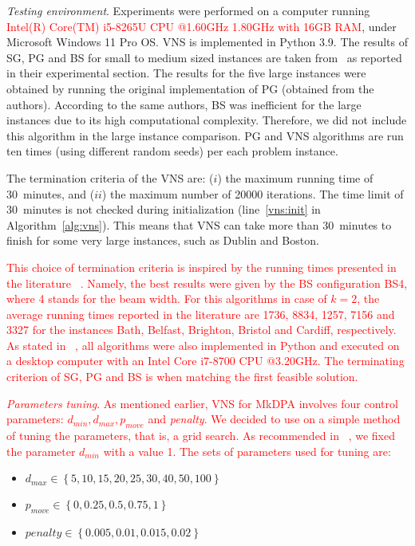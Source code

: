 \documentclass[dvipsnames,format=sigconf]{acmart} %
\begin{document}
 \emph{Testing environment}. Experiments were performed on a computer running \textcolor{red}{Intel(R) Core(TM) i5-8265U CPU @1.60GHz 1.80GHz with 16GB RAM}, under Microsoft Windows 11 Pro OS. VNS is implemented in Python 3.9. The results of SG, PG and BS for small to medium sized instances are taken from~\cite{corcoran2021heuristics} as reported in their experimental section. The results for the five large instances were obtained by running the original implementation of PG (obtained from the authors). According to the same authors, BS was inefficient for the large instances due to its high computational complexity. Therefore, we did not include this algorithm in the large instance comparison.  
 PG and VNS algorithms are run ten times (using different random seeds) per each problem instance. 
 
  The termination criteria of the VNS are: ($i$) the maximum running time of 30~minutes, and ($ii$) the maximum number of 20000 iterations. The time limit of 30~minutes is not checked during initialization (line~\ref{vns:init} in Algorithm~\ref{alg:vns}). This means that VNS can take more than 30~minutes to finish for some very large instances, such as Dublin and Boston. 
  
  \textcolor{red}{This choice of termination criteria is inspired by the running times presented in the literature ~\cite{corcoran2021heuristics}. Namely, the best results were given by the BS configuration BS4, where 4 stands for the beam width. For this algorithms in case of $k=2$, the average running times reported in the literature are 1736, 8834, 1257, 7156 and 3327 for the instances Bath, Belfast, Brighton, Bristol and Cardiff, respectively.} \textcolor{red}{As stated in ~\cite{corcoran2021heuristics}, all algorithms were also implemented in  Python and executed on a desktop computer with an Intel Core i7-8700 CPU @3.20GHz. The terminating criterion of SG, PG and BS is when matching the first feasible solution.}
   

   \textcolor{red}{\emph{Parameters tuning}. As mentioned earlier, VNS for MkDPA involves four control parameters: $d_{min}, d_{max}, p_{move}$ and \emph{penalty}. We decided to use on a simple method of tuning the parameters, that is, a grid search. As recommended in  ~\cite{mladenovic1997variable}, we fixed the parameter $d_{min}$ with a value 1. The sets of parameters used for tuning are:}

	\begin{itemize}
		\item $d_{max}\in{\left\lbrace 5, 10, 15, 20, 25, 30, 40, 50, 100\right\rbrace }$
		\item $p_{move}\in{\left\lbrace 0, 0.25, 0.5, 0.75, 1\right\rbrace }$
		\item $penalty\in{\left\lbrace 0.005, 0.01, 0.015, 0.02\right\rbrace }$
	\end{itemize}
\end{document}
